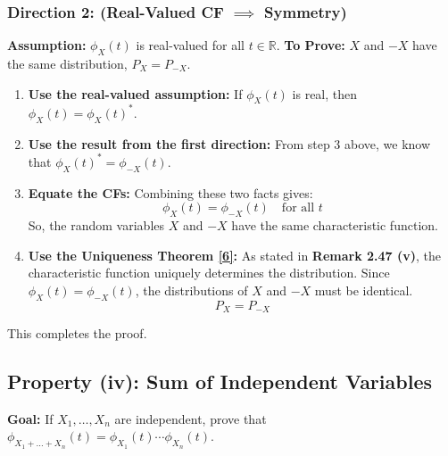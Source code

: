 \documentclass[11pt,a4paper]{article}
\begin{document}
\subsubsection{Direction 2: (Real-Valued CF $\implies$ Symmetry)}
\textbf{Assumption:} $\phi_X(t)$ is real-valued for all $t \in \mathbb{R}$.
\textbf{To Prove:} $X$ and $-X$ have the same distribution, $P_X = P_{-X}$.
\begin{enumerate}
    \item \textbf{Use the real-valued assumption:} If $\phi_X(t)$ is real, then $\phi_X(t) = \phi_X(t)^*$.
    \item \textbf{Use the result from the first direction:} From step 3 above, we know that $\phi_X(t)^* = \phi_{-X}(t)$.
    \item \textbf{Equate the CFs:} Combining these two facts gives:
    \[ \phi_X(t) = \phi_{-X}(t) \quad \text{for all } t \]
    So, the random variables $X$ and $-X$ have the same characteristic function.
    \item \textbf{Use the Uniqueness Theorem \hyperlink{note6}{[6]}:} As stated in \textbf{Remark 2.47 (v)}, the characteristic function uniquely determines the distribution. Since $\phi_X(t) = \phi_{-X}(t)$, the distributions of $X$ and $-X$ must be identical.
    \[ P_X = P_{-X} \]
\end{enumerate}
This completes the proof.

\subsection{Property (iv): Sum of Independent Variables}
\textbf{Goal:} If $X_1, \ldots, X_n$ are independent, prove that $\phi_{X_1+\dots+X_n}(t) = \phi_{X_1}(t)\cdots\phi_{X_n}(t)$.
\end{document}
